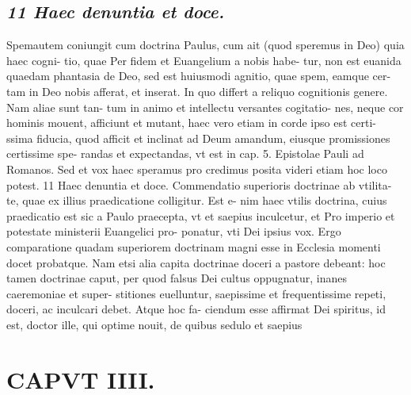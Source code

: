\documentclass{article}
\begin{document}
\begin{pages}
\subsection*{\textit{11 Haec denuntia et doce.}}Spemautem coniungit cum doctrina Paulus, cum ait (quod speremus in Deo) quia haec cogni- tio, quae Per fidem et Euangelium a nobis habe- tur, non est euanida quaedam phantasia de Deo, sed est huiusmodi agnitio, quae spem, eamque cer- tam in Deo nobis afferat, et inserat. In quo differt a reliquo cognitionis genere. Nam aliae sunt tan- tum in animo et intellectu versantes cogitatio- nes, neque cor hominis mouent, afficiunt et mutant, haec vero etiam in corde ipso est certi- ssima fiducia, quod afficit et inclinat ad Deum amandum, eiusque promissiones certissime spe- randas et expectandas, vt est in cap. 5. Epistolae Pauli ad Romanos. Sed et vox haec speramus pro credimus posita videri etiam hoc loco potest. 11 Haec denuntia et doce. Commendatio superioris doctrinae ab vtilita- te, quae ex illius praedicatione colligitur. Est e- nim haec vtilis doctrina, cuius praedicatio est sic a Paulo praecepta, vt et saepius inculcetur, et Pro imperio et potestate ministerii Euangelici pro- ponatur, vti Dei ipsius vox. Ergo comparatione quadam superiorem doctrinam magni esse in Ecclesia momenti docet probatque. Nam etsi alia capita doctrinae doceri a pastore debeant: hoc tamen doctrinae caput, per quod falsus Dei cultus oppugnatur, inanes caeremoniae et super- stitiones euelluntur, saepissime et frequentissime repeti, doceri, ac inculcari debet. Atque hoc fa- ciendum esse affirmat Dei spiritus, id est, doctor ille, qui optime nouit, de quibus sedulo et saepius  \pend
\section*{CAPVT  IIII. }
\marginpar{[ p.227 ]}\pstart {}
{}

\end{pages}
\end{document}
